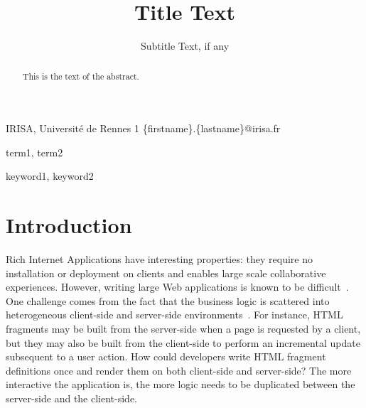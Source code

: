 \documentclass[preprint]{sigplanconf}
\begin{document}
\copyrightdata{[to be supplied]} 


\title{Title Text}
\subtitle{Subtitle Text, if any}

           {IRISA, Université de Rennes 1}
           {\{firstname\}.\{lastname\}@irisa.fr}

\maketitle

\begin{abstract}
This is the text of the abstract.
\end{abstract}


\terms
term1, term2

\keywords
keyword1, keyword2

\section{Introduction}

Rich Internet Applications have interesting properties: they require no installation or deployment on
clients and enables large scale collaborative experiences. However, writing large Web applications is known to be
difficult~\cite{Mikkonen08_SpaghettiJs,Preciado05_RIAMethodologyNecessity}. One challenge comes from the fact
that the business logic is scattered into heterogeneous client-side and server-side
environments~\cite{Echeverria09_RIA,Kuuskeri09_PartitioningClientServer}. For instance, HTML fragments may be
built from the server-side when a page is requested by a client, but they may also be built from the client-side to
perform an incremental update subsequent to a user action. How could developers write HTML fragment definitions once
and render them on both client-side and server-side? The more interactive the application is, the more logic needs to
be duplicated between the server-side and the client-side.
\end{document}
